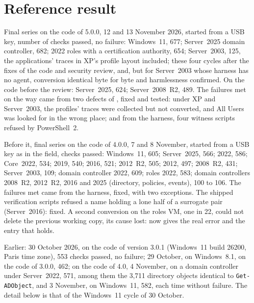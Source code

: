 \documentclass[11pt,a4paper,oneside]{report}
\begin{document}
\section{Reference result}

Final series on the code of 5.0.0, 12 and 13 November 2026, \wac{} started from
a USB key, number of checks passed, no failure: Windows~11, 677; Server~2025
domain controller, 682; 2022 roles with a certification authority, 654;
Server~2003, 125, the applications' traces in XP's profile layout included;
these four cycles after the fixes of the code and security review, and, but
for Server~2003 whose harness has no agent, conversion identical byte for byte
and harmlessness confirmed. On the code before the
review: Server~2025, 624; Server~2008~R2, 489. The failures met on the way came
from two defects of
\wac{}, fixed and tested: under XP and Server~2003, the profiles' traces were
collected but not converted, and All Users was looked for in the wrong place;
and from the harness, four witness scripts refused by PowerShell~2.

Before it, final series on the code of 4.0.0, 7 and 8 November, \wac{} started from a USB
key as in the field, checks passed: Windows~11, 605; Server~2025, 566; 2022,
586; Core~2022, 534; 2019, 540; 2016, 521; 2012~R2, 505; 2012, 497; 2008~R2,
431; Server~2003, 109; domain controller 2022, 609; roles 2022, 583; domain
controllers 2008~R2, 2012~R2, 2016 and 2025 (directory, policies, events), 100
to 106. The failures met came from the harness, fixed, with two exceptions. The
shipped verification scripts refused a name holding a lone half of a surrogate
pair (Server~2016): fixed. A second conversion on the roles VM, one in 22,
could not delete the previous working copy, its cause lost: \wac{} now gives
the real error and the entry that holds.

Earlier: 30 October 2026, on the code of version 3.0.1 (Windows~11 build 26200,
Paris time zone), 553 checks passed, no failure; 29 October, on Windows~8.1, on
the code of 3.0.0, 462; on the code of 4.0, 4 November, on a domain controller
under Server~2022, 571, among them the 3,711 directory objects identical to
\texttt{Get-ADObject}, and 3 November, on Windows~11, 582, each time without
failure. The detail below is that of the Windows~11 cycle of 30 October.
\end{document}
